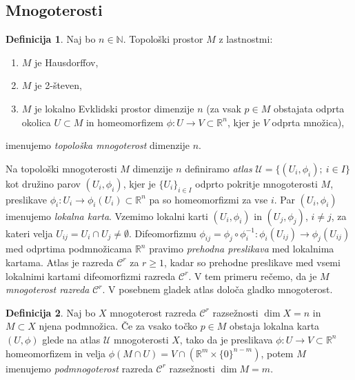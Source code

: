 \documentclass[12pt,a4paper,twoside]{article}
\theoremstyle{definition} %
\newtheorem{definicija}{Definicija}[section]
\theoremstyle{plain} %
\numberwithin{equation}{section}  %
\newcommand{\R}{\mathbb R}
\newcommand{\N}{\mathbb N}
\begin{document}
\subsection{Mnogoterosti}

\begin{definicija}
Naj bo $n \in \N$. Topološki prostor $M$ z lastnostmi:
\begin{enumerate}
\item $M$ je Hausdorffov,
\item $M$ je 2-števen,
\item $M$ je lokalno Evklidski prostor dimenzije $n$ (za vsak $p \in M$ obstajata odprta okolica $U \subset M$ in homeomorfizem $\phi \colon U \to V \subset \R^{n}$, kjer je $V$ odprta množica),
\end{enumerate}
imenujemo \emph{topološka mnogoterost} dimenzije $n$.
\end{definicija}

Na topološki mnogoterosti $M$ dimenzije $n$ definiramo \emph{atlas} $\mathcal{U} = \{ (U_{i}, \phi_{i}) ; \ i \in I \}$ kot družino parov $(U_{i}, \phi_{i})$, kjer je $\{ U_{i} \}_{i \in I}$ odprto pokritje mnogoterosti $M$, preslikave $\phi_{i} \colon U_{i} \to \phi_{i}(U_{i}) \subset \R^{n}$ pa so homeomorfizmi za vse $i$. Par $(U_{i}, \phi_{i})$ imenujemo \emph{lokalna karta}.
Vzemimo lokalni karti $(U_{i}, \phi_{i})$ in $(U_{j}, \phi_{j})$, $i \neq j$, za kateri velja $U_{ij}=U_{i} \cap U_{j} \neq \emptyset$. Difeomorfizmu $\phi_{ij} = \phi_{j} \circ \phi_{i}^{-1} \colon \phi_{i}(U_{ij}) \to \phi_{j}(U_{ij})$ med odprtima podmnožicama $\R^{n}$ pravimo \emph{prehodna preslikava} med lokalnima kartama. Atlas je razreda $\mathcal{C}^{r}$ za $r \geq 1$, kadar so prehodne preslikave med vsemi lokalnimi kartami difeomorfizmi razreda $\mathcal{C}^{r}$. V tem primeru rečemo, da je $M$ \emph{mnogoterost razreda} $\mathcal{C}^{r}$.
V posebnem gladek atlas določa gladko mnogoterost.

\begin{definicija}
Naj bo $X$ mnogoterost razreda $\mathcal{C}^{r}$ razsežnosti $\dim X = n$ in $M \subset X$ njena podmnožica. Če za vsako točko $p \in M$ obstaja lokalna karta $(U, \phi)$ glede na atlas $\mathcal{U}$ mnogoterosti $X$, tako da je preslikava $\phi \colon U \to V \subset \mathbb{R}^{n}$ homeomorfizem in velja $\phi (M \cap U) = V \cap (\mathbb{R}^{m} \times \{0\}^{n-m})$, potem $M$ imenujemo \emph{podmnogoterost} razreda $\mathcal{C}^{r}$ razsežnosti $\dim M = m$.
\end{definicija}
\end{document}
